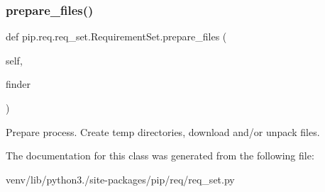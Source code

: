 \subsubsection{\texorpdfstring{prepare\+\_\+files()}{prepare\_files()}}
{\footnotesize\ttfamily def pip.\+req.\+req\+\_\+set.\+Requirement\+Set.\+prepare\+\_\+files (\begin{DoxyParamCaption}\item[{}]{self,  }\item[{}]{finder }\end{DoxyParamCaption})}

\begin{DoxyVerb}Prepare process. Create temp directories, download and/or unpack files.
\end{DoxyVerb}
 

The documentation for this class was generated from the following file\+:\begin{DoxyCompactItemize}
\item 
venv/lib/python3./site-\/packages/pip/req/req\+\_\+set.\+py\end{DoxyCompactItemize}
